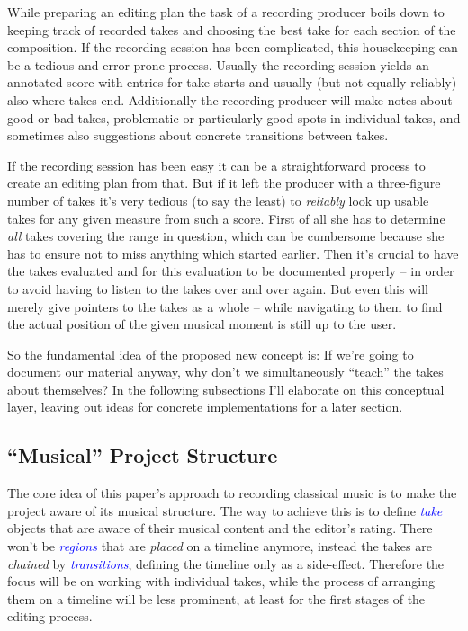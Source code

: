 \documentclass[11pt,a4paper]{article}
\newcommand*{\term}[1]{\textcolor{blue}{\emph{#1}}}
\begin{document}
While preparing an editing plan the task of a recording producer boils down to
keeping track of recorded takes and choosing the best take for each section of
the composition.
If the recording session has been complicated, this housekeeping can be a
tedious and error-prone process.
Usually the recording session yields an annotated score with entries for take
starts and usually (but not equally reliably) also where takes end.
Additionally the recording producer will make notes about good or bad takes,
problematic or particularly good spots in individual takes, and sometimes also
suggestions about concrete transitions between takes.

If the recording session has been easy it can be a straightforward process to
create an editing plan from that.
But if it left the producer with a three-figure number of takes it's very
tedious (to say the least) to \emph{reliably} look up usable takes for any given
measure from such a score.
First of all she has to determine \emph{all} takes covering the range in
question, which can be cumbersome because she has to ensure not to miss anything
which started earlier.
Then it's crucial to have the takes evaluated and for this evaluation to be
documented properly -- in order to avoid having to listen to the takes over and
over again.
But even this will merely give pointers to the takes as a whole -- while
navigating to them to find the actual position of the given musical moment is
still up to the user.

So the fundamental idea of the proposed new concept is:
If we're going to document our material anyway, why don't we simultaneously
“teach” the takes about themselves?
In the following subsections I'll elaborate on this conceptual layer, leaving out
ideas for concrete implementations for a later section.

\subsection{“Musical” Project Structure}

The core idea of this paper's approach to recording classical music is to make
the project aware of its musical structure. The way to achieve this is to define
\term{take} objects that are aware of their musical content and the editor's rating.
There won't be \term{regions} that are \emph{placed} on a timeline anymore, instead
the takes are \emph{chained} by \term{transitions}, defining the timeline only as a side-effect.
Therefore the focus will be on working with individual takes, while the process of
arranging them on a timeline will be less prominent, at least for the first stages
of the editing process. 
\end{document}
